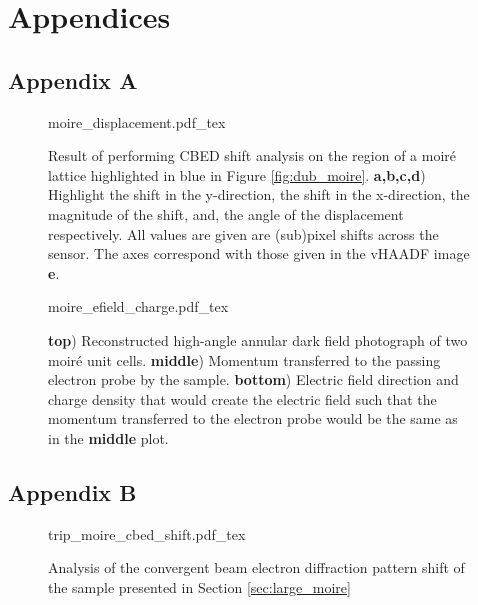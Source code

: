 \chapter{Appendices}

\section{Appendix A}
\label{appendix:a}

\begin{figure}[b]
    \centering
    \def\svgwidth{.95\linewidth}
    {moire_displacement.pdf_tex}
    \caption{Result of performing CBED shift analysis on the region of a moiré lattice highlighted in blue in Figure \ref{fig:dub_moire}. \textbf{a,b,c,d}) Highlight the shift in the y-direction, the shift in the x-direction, the magnitude of the shift, and, the angle of the displacement respectively. All values are given are (sub)pixel shifts across the sensor. The axes correspond with those given in the vHAADF image \textbf{e}.}
    \label{fig:m_dis}
\end{figure}

\begin{figure}[h]
    \centering
    \def\svgwidth{.5\linewidth}
    {moire_efield_charge.pdf_tex}
    \caption{\textbf{top}) Reconstructed high-angle annular dark field photograph of two moiré unit cells. \textbf{middle}) Momentum transferred to the passing electron probe by the sample. \textbf{bottom}) Electric field direction and charge density that would create the electric field such that the momentum transferred to the electron probe would be the same as in the \textbf{middle} plot.}
    \label{fig:m_mom}
\end{figure}

\section{Appendix B}
\label{appendix:b}
\begin{figure}[h]
    \centering
    \def\svgwidth{.7\linewidth}
    {trip_moire_cbed_shift.pdf_tex}
    \caption{Analysis of the convergent beam electron diffraction pattern shift of the sample presented in Section \ref{sec:large_moire}}
    \label{fig:appendix_cbed_trip_moire}
\end{figure}


\subsection*{}
